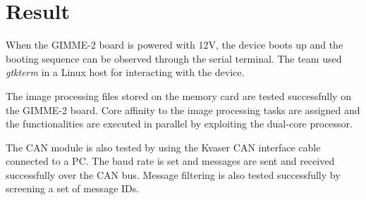 \section{Result}\label{sec:result}
When the GIMME-2 board is powered with 12V, the device boots up and the booting sequence can be observed through the serial terminal. The team used \textit{gtkterm} in a Linux host for interacting with the device. 

The image processing files stored on the memory card are tested successfully on the GIMME-2 board. Core affinity to the image processing tasks are assigned and the functionalities are executed in parallel by exploiting the dual-core processor.

The CAN module is also tested by using the Kvaser CAN interface cable connected to a PC. The baud rate is set and messages are sent and received successfully over the CAN bus. Message filtering is also tested successfully by screening a set of message IDs.

%
